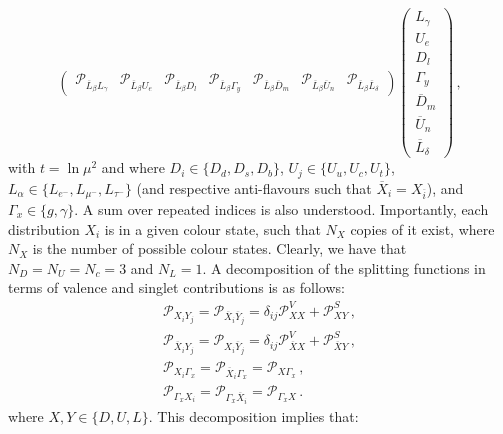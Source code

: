 \documentclass[10pt,a4paper]{article}
\begin{document}
\begin{equation}
\begin{pmatrix}
\mathcal{P}_{\overline{L}_\beta L_\gamma} & \mathcal{P}_{\overline{L}_\beta U_e} & \mathcal{P}_{\overline{L}_\beta D_l} & \mathcal{P}_{\overline{L}_\beta \Gamma_y} & \mathcal{P}_{\overline{L}_\beta \overline{D}_m} & \mathcal{P}_{\overline{L}_\beta \overline{U}_n} & \mathcal{P}_{\overline{L}_\beta \overline{L}_\delta}
\end{pmatrix}
\begin{pmatrix}
L_\gamma\\
U_e \\
D_l\\
\Gamma_y\\
\overline{D}_m\\
\overline{U}_n\\
\overline{L}_\delta
\end{pmatrix}\,,
\end{equation}
with $t=\ln\mu^2$ and where $D_i\in\{D_d,D_s,D_b\}$,
$U_j\in\{U_u,U_c,U_t\}$,
$L_\alpha\in \{L_{e^-},L_{\mu^-},L_{\tau^-}\}$ (and respective
anti-flavours such that $\overline{X}_i=X_{\overline{i}}$), and
$\Gamma_x\in\{g,\gamma\}$.  A sum over repeated indices is also
understood. Importantly, each distribution $X_i$ is in a given colour
state, such that $N_X$ copies of it exist, where $N_X$ is the number
of possible colour states. Clearly, we have that $N_D=N_U=N_c=3$ and
$N_L=1$. A decomposition of the splitting functions in terms of
valence and singlet contributions is as follows:
\begin{equation}
\begin{array}{l}
\mathcal{P}_{X_iY_j} = \mathcal{P}_{\overline{X}_i\overline{Y}_j} = \delta_{ij} \mathcal{P}_{XX}^{V}+\mathcal{P}_{XY}^{S}\,,\\
\mathcal{P}_{\overline{X}_iY_j} = \mathcal{P}_{X_i\overline{Y}_j}  = \delta_{ij} \mathcal{P}_{\overline{X}X}^{V}+\mathcal{P}_{\overline{X}Y}^{S}\,,\\
\mathcal{P}_{X_i\Gamma_x}  =\mathcal{P}_{\overline{X}_i\Gamma_x} =\mathcal{P}_{X\Gamma_x} \,,\\
\mathcal{P}_{\Gamma_x X_i}  =\mathcal{P}_{\Gamma_x\overline{X}_i} =\mathcal{P}_{\Gamma_x X} \,.
\end{array}
\end{equation}
where $X,Y\in\{D,U,L\}$. This decomposition implies that:
\end{document}
